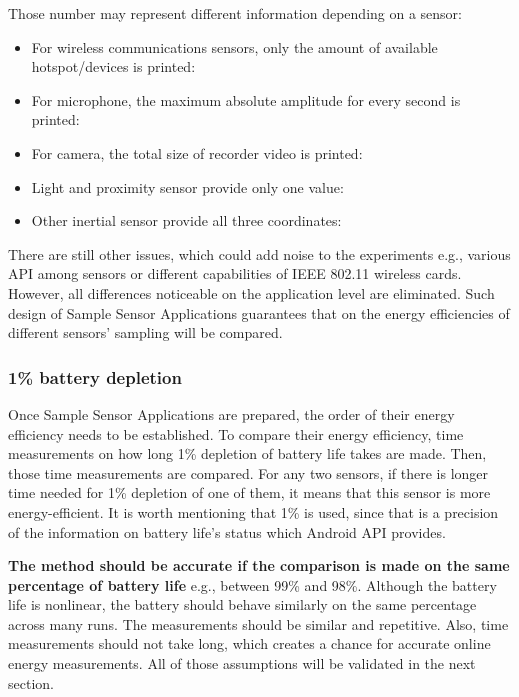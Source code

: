 Those number may represent different information depending on a sensor:
\begin{itemize}
	\item For wireless communications sensors, only the amount of available hotspot/devices is printed: 
	\item For microphone, the maximum absolute amplitude for every second is printed:
	\item For camera, the total size of recorder video is printed:
	\item Light and proximity sensor provide only one value:
	\item Other inertial sensor provide all three coordinates:
\end{itemize}

There are still other issues, which could add noise to the experiments e.g., various API among sensors or different capabilities of IEEE 802.11 wireless cards. However, all differences noticeable on the application level are eliminated. Such design of Sample Sensor Applications guarantees that on the energy efficiencies of different sensors' sampling will be compared. 
				
\subsubsection{1\% battery depletion}	
\label{s:design:measurements:method}
\hspace{10pt} Once  Sample Sensor Applications are prepared, the order of their energy efficiency needs to be established. To compare their energy efficiency, time measurements on how long 1\% depletion of battery life takes are made. Then, those time measurements are compared. For any two sensors, if there is longer time needed for 1\% depletion of one of them, it means that this sensor is more energy-efficient. It is worth mentioning that 1\% is used, since that is a precision of the information on battery life's status which Android API provides.

\textbf{The method should be accurate if the comparison is made on the same percentage of battery life} e.g., between 99\% and 98\%. Although the battery life is nonlinear, the battery should behave similarly on the same percentage across many runs. The measurements should be similar and repetitive. Also, time measurements should not take long, which creates a chance for accurate online energy measurements. All of those assumptions will be validated in the next section.

